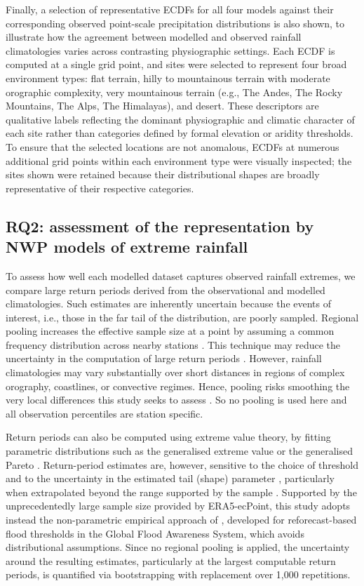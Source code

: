 \documentclass{ametsocV6.1}
\begin{document}
Finally, a selection of representative ECDFs for all four models against their corresponding observed point-scale precipitation distributions is also shown, to illustrate how the agreement between modelled and observed rainfall climatologies varies across contrasting physiographic settings. Each ECDF is computed at a single grid point, and sites were selected to represent four broad environment types: flat terrain, hilly to mountainous terrain with moderate orographic complexity, very mountainous terrain (e.g., The Andes, The Rocky Mountains, The Alps, The Himalayas), and desert. These descriptors are qualitative labels reflecting the dominant physiographic and climatic character of each site rather than categories defined by formal elevation or aridity thresholds. To ensure that the selected locations are not anomalous, ECDFs at numerous additional grid points within each environment type were visually inspected; the sites shown were retained because their distributional shapes are broadly representative of their respective categories.

\subsection{RQ2: assessment of the representation by NWP models of extreme rainfall}

To assess how well each modelled dataset captures observed rainfall extremes, we compare large return periods derived from the observational and modelled climatologies. Such estimates are inherently uncertain because the events of interest, i.e., those in the far tail of the distribution, are poorly sampled. Regional pooling increases the effective sample size at a point by assuming a common frequency distribution across nearby stations \citep{Hosking1997}. This technique may reduce the uncertainty in the computation of large return periods \citep{Kim2025}. However, rainfall climatologies may vary substantially over short distances in regions of complex orography, coastlines, or convective regimes. Hence, pooling risks smoothing the very local differences this study seeks to assess \citep{Khaliq2006, Ahmed2023}. So no pooling is used here and all observation percentiles are station specific.

Return periods can also be computed using extreme value theory, by fitting parametric distributions such as the generalised extreme value or the generalised Pareto \citep{Coles2001}. Return-period estimates are, however, sensitive to the choice of threshold and to the uncertainty in the estimated tail (shape) parameter \citep{Schneider2021}, particularly when extrapolated beyond the range supported by the sample \citep{Scarrott2012, Pan2022}. Supported by the unprecedentedly large sample size provided by ERA5-ecPoint, this study adopts instead the non-parametric empirical approach of \citet{Zsoter2020}, developed for reforecast-based flood thresholds in the Global Flood Awareness System, which avoids distributional assumptions. Since no regional pooling is applied, the uncertainty around the resulting estimates, particularly at the largest computable return periods, is quantified via bootstrapping with replacement over 1,000 repetitions.
\end{document}
